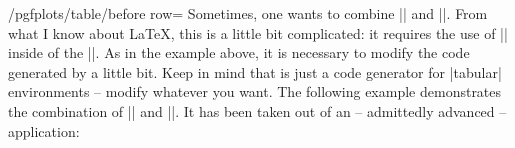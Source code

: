 \documentclass[a4paper]{ltxdoc}
\begin{document}
\begin{key}{/pgfplots/table/before row=}
    Sometimes, one wants to combine |\multicolumn| and |\rowcolor|. From what I
    know about \LaTeX{}, this is a little bit complicated: it requires the use of
    |\columncolor| inside of the |\multicolumn|. As in the example above, it is
    necessary to modify the code generated by \PGFPlotstable{} a little bit.
    Keep in mind that \PGFPlotstable{} is just a code generator for |tabular|
    environments -- modify whatever you want. The following example
    demonstrates the combination of |\multicolumn| and |\rowcolor|. It has been
    taken out of an -- admittedly advanced -- application:
\begin{codeexample}[]
\end{codeexample}


\end{key}
\end{document}
